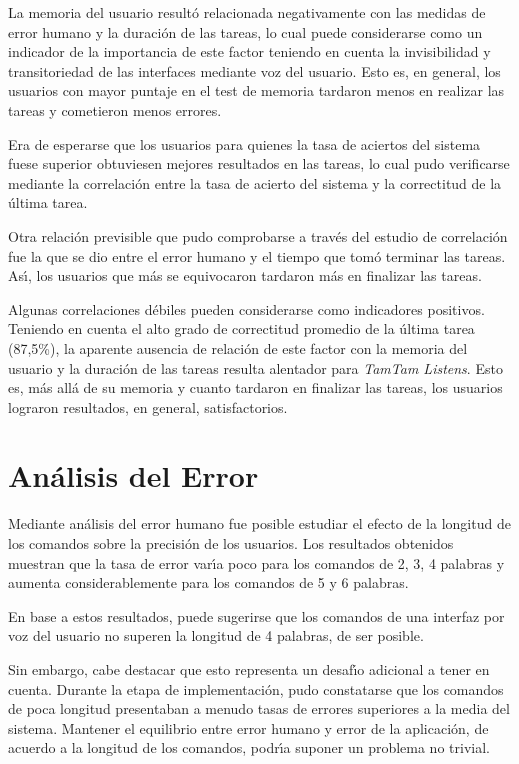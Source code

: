 La memoria del usuario result\'o relacionada negativamente con las medidas de error humano
y la duraci\'on de las tareas, lo cual puede considerarse como un indicador de la importancia
de este factor teniendo en cuenta la invisibilidad y transitoriedad de las interfaces mediante
voz del usuario. Esto es, en general, los usuarios con mayor puntaje en el test de memoria
tardaron menos en realizar las tareas y cometieron menos errores.

Era de esperarse que los usuarios para quienes la tasa de aciertos del sistema fuese superior
obtuviesen mejores resultados en las tareas, lo cual pudo verificarse mediante la correlaci\'on 
entre la tasa de acierto del sistema y la correctitud de la \'ultima tarea.

Otra relaci\'on previsible que pudo comprobarse a trav\'es del estudio de correlaci\'on fue la que
se dio entre el error humano y el tiempo que tom\'o terminar las tareas. As{\'\i}, los usuarios que
m\'as se equivocaron tardaron m\'as en finalizar las tareas.

Algunas correlaciones d\'ebiles pueden considerarse como indicadores positivos. Teniendo en cuenta
el alto grado de correctitud promedio de la \'ultima tarea (87,5\%), la aparente ausencia de relaci\'on 
de este factor con la memoria del usuario y la duraci\'on de las tareas resulta alentador para
\emph{TamTam Listens}. Esto es, m\'as all\'a de su memoria y cuanto tardaron en finalizar las tareas,
los usuarios lograron resultados, en general, satisfactorios.

\section{An\'alisis del Error}
Mediante an\'alisis del error humano fue posible estudiar el efecto de la longitud de los comandos
sobre la precisi\'on de los usuarios. Los resultados obtenidos muestran que la tasa de error
var{\'\i}a poco para los comandos de 2, 3, 4 palabras y aumenta considerablemente para los comandos
de 5 y 6 palabras.

En base a estos resultados, puede sugerirse que los comandos de una interfaz por voz del usuario 
no superen la longitud de 4 palabras, de ser posible.

Sin embargo, cabe destacar que esto representa un desaf{\'\i}o adicional a tener en cuenta.
Durante la etapa de implementaci\'on, pudo constatarse que los comandos de poca longitud presentaban
a menudo tasas de errores superiores a la media del sistema.
Mantener el equilibrio entre error humano y error de la aplicaci\'on, de acuerdo a la longitud
de los comandos, podr{\'\i}a suponer un problema no trivial. 

